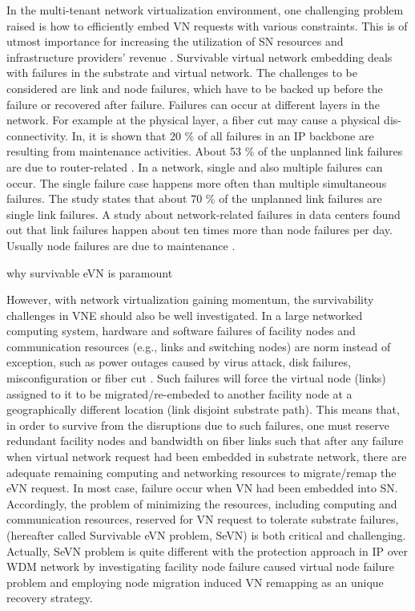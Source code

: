 In the multi-tenant network virtualization environment, one challenging problem raised is how to efficiently embed VN requests with various constraints. This is of utmost importance for increasing the utilization of SN resources and infrastructure providers’ revenue \cite{koponen2014network}. Survivable virtual network embedding deals with failures in the substrate and virtual network. The challenges to be considered are link and node failures, which have to be backed up before the failure or recovered after failure. Failures can occur at different layers in the network. For example at the physical layer, a fiber cut
may cause a physical dis-connectivity. In\cite{markopoulou2004characterization}, it is shown that 20 \% of all failures in an IP backbone are resulting from
maintenance activities. About 53 \% of the unplanned link failures are due to router-related \cite{markopoulou2004characterization}. In a network, single
and also multiple failures can occur. The single failure case happens more often than multiple simultaneous failures. The study \cite{markopoulou2004characterization} states that about 70 \% of the unplanned link failures are single link failures. A study \cite{gill2011understanding} about network-related failures in data centers found out that link failures happen about ten times more than node failures per day. Usually node failures are due to maintenance \cite{gill2011understanding}.


why survivable eVN is paramount

However, with network virtualization gaining momentum, the survivability challenges in VNE should also be well investigated. In a large networked computing system, hardware and software failures of facility nodes and communication resources (e.g., links and switching nodes) are norm instead of exception, such as power outages caused by virus attack, disk failures, misconfiguration or fiber cut \cite{xu2012survivable,rahman2010survivable,rahman2013svne,guo2011shared,chen2010resilient}. Such failures will force the virtual node (links) assigned to it to be migrated/re-embeded to another facility node at a geographically different location (link disjoint substrate path). This means that, in order to survive from the disruptions due to such failures, one must reserve redundant facility nodes and bandwidth on fiber links such that after any failure when virtual network request had been embedded in substrate network, there are adequate remaining computing and networking resources to migrate/remap the eVN request. In most case, failure occur when VN had been embedded into SN. Accordingly, the problem of minimizing the resources, including computing and communication resources, reserved for VN request to tolerate substrate failures, (hereafter called Survivable eVN problem, SeVN) is both critical and challenging. Actually, SeVN problem is quite different with the protection approach
in IP over WDM network by investigating facility node failure caused virtual node failure problem and employing node migration induced VN remapping as an unique recovery strategy.


